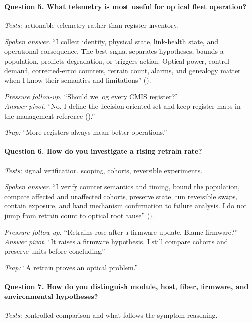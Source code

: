 \paragraph{Question 5. What telemetry is most useful for optical fleet
operation?}
\textit{Tests:} actionable telemetry rather than register inventory.

\textit{Spoken answer.}
``I collect identity, physical state, link-health state, and operational
consequence. The best signal separates hypotheses, bounds a population,
predicts degradation, or triggers action. Optical power, control demand,
corrected-error counters, retrain count, alarms, and genealogy matter when I
know their semantics and limitations'' ().

\textit{Pressure follow-up.} ``Should we log every CMIS register?''\\
\textit{Answer pivot.} ``No. I define the decision-oriented set and keep
register maps in the management reference ().''

\textit{Trap:} ``More registers always mean better operations.''

\paragraph{Question 6. How do you investigate a rising retrain rate?}
\textit{Tests:} signal verification, scoping, cohorts, reversible experiments.

\textit{Spoken answer.}
``I verify counter semantics and timing, bound the population, compare
affected and unaffected cohorts, preserve state, run reversible swaps, contain
exposure, and hand mechanism confirmation to failure analysis. I do not jump
from retrain count to optical root cause''
().

\textit{Pressure follow-up.} ``Retrains rose after a firmware update. Blame
firmware?''\\
\textit{Answer pivot.} ``It raises a firmware hypothesis. I still compare
cohorts and preserve units before concluding.''

\textit{Trap:} ``A retrain proves an optical problem.''

\paragraph{Question 7. How do you distinguish module, host, fiber, firmware,
and environmental hypotheses?}
\textit{Tests:} controlled comparison and what-follows-the-symptom reasoning.

